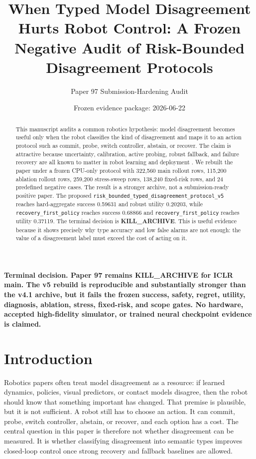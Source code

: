 \documentclass[11pt]{article}
\title{When Typed Model Disagreement Hurts Robot Control: A Frozen Negative Audit of Risk-Bounded Disagreement Protocols}
\author{Paper 97 Submission-Hardening Audit}
\date{Frozen evidence package: 2026-06-22}
\newcommand{\method}[1]{\texttt{#1}}
\newcommand{\decisionbox}[1]{\textbf{#1}}
\begin{document}
\maketitle

\begin{abstract}
This manuscript audits a common robotics hypothesis: model disagreement becomes useful only when the robot classifies the kind of disagreement and maps it to an action protocol such as commit, probe, switch controller, abstain, or recover. The claim is attractive because uncertainty, calibration, active probing, robust fallback, and failure recovery are all known to matter in robot learning and deployment \citep{hekler2016agile1,wang2022improved2,giubilini2025expertise3} \citep{viereck2017learning4,viereck2017learning5,sun2024learning6}. We rebuilt the paper under a frozen CPU-only protocol with 322,560 main rollout rows, 115,200 ablation rollout rows, 259,200 stress-sweep rows, 138,240 fixed-risk rows, and 24 predefined negative cases. The result is a stronger archive, not a submission-ready positive paper. The proposed \method{risk\_bounded\_typed\_disagreement\_protocol\_v5} reaches hard-aggregate success 0.59631 and robust utility 0.20203, while \method{recovery\_first\_policy} reaches success 0.68866 and \method{recovery\_first\_policy} reaches utility 0.37119. The terminal decision is \textbf{KILL\_ARCHIVE}. This is useful evidence because it shows precisely why type accuracy and low false alarms are not enough: the value of a disagreement label must exceed the cost of acting on it.
\end{abstract}

\decisionbox{\textbf{Terminal decision.} Paper 97 remains \textbf{KILL\_ARCHIVE} for ICLR main. The v5 rebuild is reproducible and substantially stronger than the v4.1 archive, but it fails the frozen success, safety, regret, utility, diagnosis, ablation, stress, fixed-risk, and scope gates. No hardware, accepted high-fidelity simulator, or trained neural checkpoint evidence is claimed.}

\section{Introduction}
Robotics papers often treat model disagreement as a resource: if learned dynamics, policies, visual predictors, or contact models disagree, then the robot should know that something important has changed. That premise is plausible, but it is not sufficient. A robot still has to choose an action. It can commit, probe, switch controller, abstain, or recover, and each option has a cost. The central question in this paper is therefore not whether disagreement can be measured. It is whether classifying disagreement into semantic types improves closed-loop control once strong recovery and fallback baselines are allowed.
\end{document}
